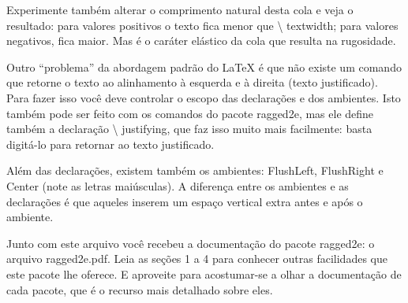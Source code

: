 \documentclass[a4paper,12pt]{article}
\newcommand{\ambiente}[1]{{\normalfont\color{orange!70!black} #1}}
\newcommand{\arquivo}[1]{{\normalfont\color{green!50!black} #1}}
\newcommand{\comando}[1]{{\normalfont\sffamily\textbackslash\color{blue!30!black} #1}}
\newcommand{\pacote}[1]{{\normalfont\color{red!70!black} #1}}
\begin{document}
	

	Experimente também alterar o comprimento natural desta cola e veja o resultado: para valores positivos o texto fica menor que \comando{textwidth}; para valores negativos, fica maior. Mas é o caráter elástico da cola que resulta na rugosidade.

		

	\justifying %

	Outro ``problema'' da abordagem padrão do LaTeX é que não existe um comando que retorne o texto ao alinhamento à esquerda e à direita (texto justificado). Para fazer isso você deve controlar o escopo das declarações e dos ambientes. Isto também pode ser feito com os comandos do pacote \pacote{ragged2e}, mas ele define também a declaração \comando{justifying}, que faz isso muito mais facilmente: basta digitá-lo para retornar ao texto justificado.

	

	Além das declarações, existem também os ambientes: \ambiente{FlushLeft}, \ambiente{FlushRight} e \ambiente{Center} (note as letras maiúsculas). A diferença entre os ambientes e as declarações é que aqueles inserem um espaço vertical extra antes e após o ambiente.

	

	Junto com este arquivo você recebeu a documentação do pacote \pacote{ragged2e}: o arquivo \arquivo{ragged2e.pdf}. Leia as seções 1 a 4 para conhecer outras facilidades que este pacote lhe oferece. E aproveite para acostumar-se a olhar a documentação de cada pacote, que é o recurso mais detalhado sobre eles.

	
\end{document}
